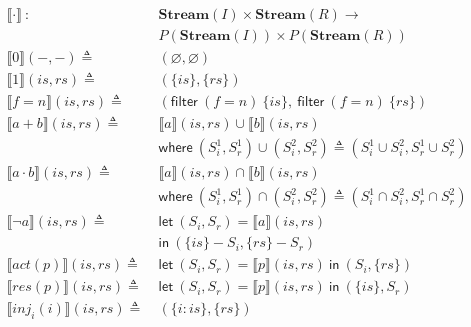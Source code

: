 \documentclass[12pt, letterpaper]{article}
\let\emptyset\varnothing
\newcommand\interp[1]{\llbracket #1 \rrbracket}
\begin{document}
  \begin{align*}
    \interp{ \cdot }\ 
      :\ \ &
      \mathbf{Stream}(I)\times \mathbf{Stream}(R) \rightarrow \\
      & P(\mathbf{Stream}(I))\times P(\mathbf{Stream}(R)) 
      \\
    \interp{ 0 }(-, -)
      \triangleq\ &
      (\emptyset , \emptyset)
      \\ %
    \interp{ 1 }(\mathit{is}, \mathit{rs})
      \triangleq\ &
      (\{\mathit{is}\},\{\mathit{rs}\})
      \\
    \interp{ f=n }(\mathit{is}, \mathit{rs})
      \triangleq\ &
      (\mathsf{filter}\ (f=n)\ \{\mathit{is}\},\
       \mathsf{filter}\ (f=n)\ \{\mathit{rs}\}) 
      \\
    \interp{ a + b }(\mathit{is}, \mathit{rs})
      \triangleq\ &
      \interp { a }(\mathit{is}, \mathit{rs})\cup
      \interp { b }(\mathit{is}, \mathit{rs}) \\
      &\mathsf{where}\ (S_i^1, S_r^1)\cup (S_i^2, S_r^2)\triangleq
        (S_i^1\cup S_i^2, S_r^1\cup S_r^2)\\
    \interp { a \cdot b }(\mathit{is}, \mathit{rs})
      \triangleq\ &
      \interp { a }(\mathit{is}, \mathit{rs})\cap
      \interp { b }(\mathit{is}, \mathit{rs}) \\
      &\mathsf{where}\ (S_i^1, S_r^1)\cap (S_i^2, S_r^2)\triangleq
        (S_i^1\cap S_i^2, S_r^1\cap S_r^2)\\
    \interp { \neg a }(\mathit{is}, \mathit{rs})
      \triangleq\ &
      \mathsf{let}\ (S_i, S_r) = \interp {a}(\mathit{is}, \mathit{rs}) \\
      &\mathsf{in}\ (\{\mathit{is}\} - S_i, \{\mathit{rs}\} - S_r)
      \\
    \interp { act(p) }(\mathit{is}, \mathit{rs})
      \triangleq\ &
      \mathsf{let}\ (S_i,S_r) = \interp {p}(\mathit{is}, \mathit{rs})\ 
      \mathsf{in}\ (S_i, \{\mathit{rs}\})
      \\
    \interp { res(p) }(\mathit{is}, \mathit{rs})
      \triangleq\ &
      \mathsf{let}\ (S_i,S_r) = \interp {p}(\mathit{is}, \mathit{rs})\ 
      \mathsf{in}\ (\{\mathit{is}\}, S_r)
      \\
    \interp { inj_{i}(i) }(\mathit{is}, \mathit{rs})
      \triangleq\ &
      (\{\mathit{i : is}\}, \{\mathit{rs}\}) 

\end{align*}
\end{document}

